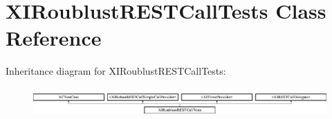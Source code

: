 \hypertarget{interface_x_i_roublust_r_e_s_t_call_tests}{}\section{X\+I\+Roublust\+R\+E\+S\+T\+Call\+Tests Class Reference}
\label{interface_x_i_roublust_r_e_s_t_call_tests}
Inheritance diagram for X\+I\+Roublust\+R\+E\+S\+T\+Call\+Tests\+:\begin{figure}[H]
\begin{center}
\leavevmode
\includegraphics[height=1.142857cm]{interface_x_i_roublust_r_e_s_t_call_tests}
\end{center}
\end{figure}
